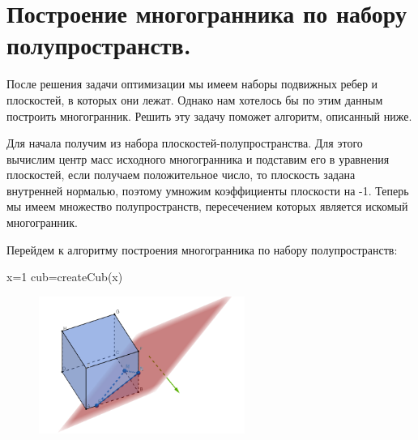 \documentclass[14pt,fleqn,a4paper]{scrartcl}
\begin{document}
\section{Построение многогранника по набору полупространств.}
После решения задачи оптимизации мы имеем наборы подвижных ребер и плоскостей, в которых они лежат. Однако нам хотелось бы по этим данным построить многогранник. Решить эту задачу поможет алгоритм, описанный ниже.
\par
Для начала получим из набора плоскостей-полупространства. Для этого вычислим центр масс исходного многогранника и подставим его в уравнения плоскостей, если получаем положительное число, то плоскость задана внутренней нормалью, поэтому умножим коэффициенты плоскости на -1. Теперь мы имеем множество полупространств, пересечением которых является искомый многогранник. 
\par
Перейдем к алгоритму построения многогранника по набору полупространств:
\begin{algorithm}[H]

x=1\;
cub=createCub(x)\;

\end{algorithm}
\begin{figure} 

\includegraphics[width=0.6\textwidth]{cub3.png}
\end{figure}
\end{document}
